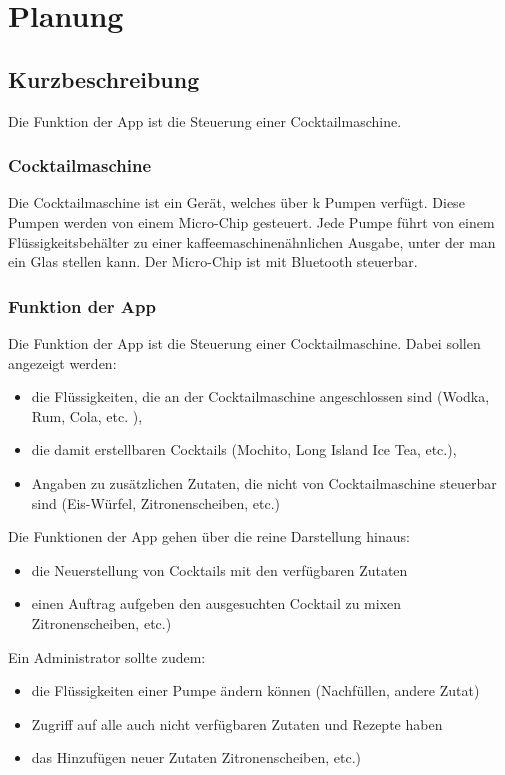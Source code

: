 
\newpage

\chapter{Planung} %
\label{cha:planung}

\section{Kurzbeschreibung}
\label{sec:kurzbeschreibung}
Die Funktion der App ist die Steuerung einer Cocktailmaschine.

\subsection{Cocktailmaschine} 
Die Cocktailmaschine ist ein Gerät, welches über k Pumpen verfügt. Diese Pumpen werden von einem Micro-Chip gesteuert. Jede Pumpe führt von einem Flüssigkeitsbehälter zu einer kaffeemaschinenähnlichen Ausgabe, unter der man ein Glas stellen kann. Der Micro-Chip ist mit Bluetooth steuerbar.

\subsection{Funktion der App} 
Die Funktion der App ist die Steuerung einer Cocktailmaschine. Dabei sollen angezeigt werden:
\begin{itemize}
\item	die Flüssigkeiten, die an der Cocktailmaschine angeschlossen sind (Wodka, Rum, Cola, etc. ),
\item	die damit erstellbaren Cocktails (Mochito, Long Island Ice Tea, etc.),
\item	Angaben zu zusätzlichen Zutaten, die nicht von Cocktailmaschine steuerbar sind (Eis-Würfel, Zitronenscheiben, etc.)
\end{itemize}
Die Funktionen der App gehen über die reine Darstellung hinaus:
\begin{itemize}
\item	die Neuerstellung von Cocktails mit den verfügbaren Zutaten
\item	einen Auftrag aufgeben den ausgesuchten Cocktail zu mixen
Zitronenscheiben, etc.)
\end{itemize}
Ein Administrator sollte zudem:
\begin{itemize}
\item	die Flüssigkeiten einer Pumpe ändern können (Nachfüllen, andere Zutat)
\item	Zugriff auf alle auch nicht verfügbaren Zutaten und Rezepte haben
\item	das Hinzufügen neuer Zutaten
Zitronenscheiben, etc.)
\end{itemize}





